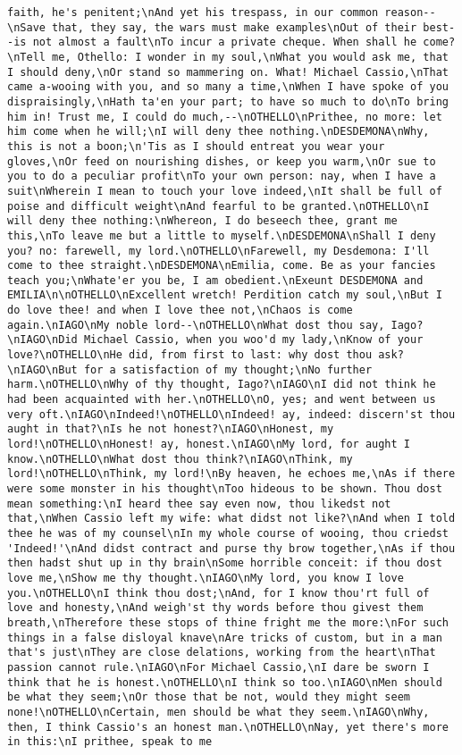 \begin{verbatim}
faith, he's penitent;\nAnd yet his trespass, in our common reason--\nSave that, they say, the wars must make examples\nOut of their best--is not almost a fault\nTo incur a private cheque. When shall he come?\nTell me, Othello: I wonder in my soul,\nWhat you would ask me, that I should deny,\nOr stand so mammering on. What! Michael Cassio,\nThat came a-wooing with you, and so many a time,\nWhen I have spoke of you dispraisingly,\nHath ta'en your part; to have so much to do\nTo bring him in! Trust me, I could do much,--\nOTHELLO\nPrithee, no more: let him come when he will;\nI will deny thee nothing.\nDESDEMONA\nWhy, this is not a boon;\n'Tis as I should entreat you wear your gloves,\nOr feed on nourishing dishes, or keep you warm,\nOr sue to you to do a peculiar profit\nTo your own person: nay, when I have a suit\nWherein I mean to touch your love indeed,\nIt shall be full of poise and difficult weight\nAnd fearful to be granted.\nOTHELLO\nI will deny thee nothing:\nWhereon, I do beseech thee, grant me this,\nTo leave me but a little to myself.\nDESDEMONA\nShall I deny you? no: farewell, my lord.\nOTHELLO\nFarewell, my Desdemona: I'll come to thee straight.\nDESDEMONA\nEmilia, come. Be as your fancies teach you;\nWhate'er you be, I am obedient.\nExeunt DESDEMONA and EMILIA\n\nOTHELLO\nExcellent wretch! Perdition catch my soul,\nBut I do love thee! and when I love thee not,\nChaos is come again.\nIAGO\nMy noble lord--\nOTHELLO\nWhat dost thou say, Iago?\nIAGO\nDid Michael Cassio, when you woo'd my lady,\nKnow of your love?\nOTHELLO\nHe did, from first to last: why dost thou ask?\nIAGO\nBut for a satisfaction of my thought;\nNo further harm.\nOTHELLO\nWhy of thy thought, Iago?\nIAGO\nI did not think he had been acquainted with her.\nOTHELLO\nO, yes; and went between us very oft.\nIAGO\nIndeed!\nOTHELLO\nIndeed! ay, indeed: discern'st thou aught in that?\nIs he not honest?\nIAGO\nHonest, my lord!\nOTHELLO\nHonest! ay, honest.\nIAGO\nMy lord, for aught I know.\nOTHELLO\nWhat dost thou think?\nIAGO\nThink, my lord!\nOTHELLO\nThink, my lord!\nBy heaven, he echoes me,\nAs if there were some monster in his thought\nToo hideous to be shown. Thou dost mean something:\nI heard thee say even now, thou likedst not that,\nWhen Cassio left my wife: what didst not like?\nAnd when I told thee he was of my counsel\nIn my whole course of wooing, thou criedst 'Indeed!'\nAnd didst contract and purse thy brow together,\nAs if thou then hadst shut up in thy brain\nSome horrible conceit: if thou dost love me,\nShow me thy thought.\nIAGO\nMy lord, you know I love you.\nOTHELLO\nI think thou dost;\nAnd, for I know thou'rt full of love and honesty,\nAnd weigh'st thy words before thou givest them breath,\nTherefore these stops of thine fright me the more:\nFor such things in a false disloyal knave\nAre tricks of custom, but in a man that's just\nThey are close delations, working from the heart\nThat passion cannot rule.\nIAGO\nFor Michael Cassio,\nI dare be sworn I think that he is honest.\nOTHELLO\nI think so too.\nIAGO\nMen should be what they seem;\nOr those that be not, would they might seem none!\nOTHELLO\nCertain, men should be what they seem.\nIAGO\nWhy, then, I think Cassio's an honest man.\nOTHELLO\nNay, yet there's more in this:\nI prithee, speak to me 
\end{verbatim}
